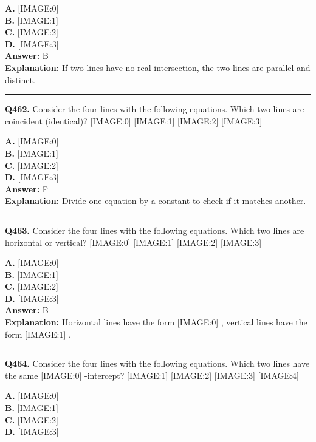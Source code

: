 \documentclass[12pt]{article}
\begin{document}
\textbf{A.} [IMAGE:0] \\
\textbf{B.} [IMAGE:1] \\
\textbf{C.} [IMAGE:2] \\
\textbf{D.} [IMAGE:3] \\

\textbf{Answer:} B \\
\textbf{Explanation:} If two lines have no real intersection, the two lines are parallel and distinct.

\hrule
\vspace{1em}


\noindent
\textbf{Q462.} Consider the four lines with the following equations.
Which two lines are coincident (identical)?
[IMAGE:0]
[IMAGE:1]
[IMAGE:2]
[IMAGE:3]



\textbf{A.} [IMAGE:0] \\
\textbf{B.} [IMAGE:1] \\
\textbf{C.} [IMAGE:2] \\
\textbf{D.} [IMAGE:3] \\

\textbf{Answer:} F \\
\textbf{Explanation:} Divide one equation by a constant to check if it matches another.

\hrule
\vspace{1em}


\noindent
\textbf{Q463.} Consider the four lines with the following equations.
Which two lines are horizontal or vertical?
[IMAGE:0]
[IMAGE:1]
[IMAGE:2]
[IMAGE:3]



\textbf{A.} [IMAGE:0] \\
\textbf{B.} [IMAGE:1] \\
\textbf{C.} [IMAGE:2] \\
\textbf{D.} [IMAGE:3] \\

\textbf{Answer:} B \\
\textbf{Explanation:} Horizontal lines have the form
[IMAGE:0]
, vertical lines have the form
[IMAGE:1]
.

\hrule
\vspace{1em}


\noindent
\textbf{Q464.} Consider the four lines with the following equations.
Which two lines have the same
[IMAGE:0]
-intercept?
[IMAGE:1]
[IMAGE:2]
[IMAGE:3]
[IMAGE:4]



\textbf{A.} [IMAGE:0] \\
\textbf{B.} [IMAGE:1] \\
\textbf{C.} [IMAGE:2] \\
\textbf{D.} [IMAGE:3] \\
\end{document}
